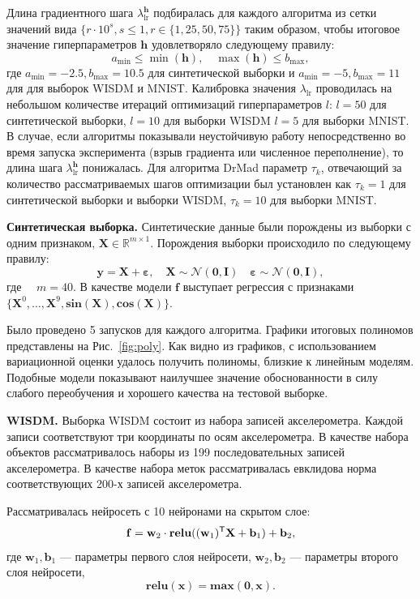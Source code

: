 Длина градиентного шага $ \lambda_{\text{lr}}^{\mathbf{h}}$ подбиралась для каждого алгоритма из сетки значений вида $\{r \cdot 10^{s}, s \leq 1, r \in \{1,25,50,75\}\}$  таким образом, чтобы итоговое значение гиперпараметров  $\mathbf{h}$  удовлетворяло следующему правилу:
\[
    a_\text{min} \leq  \min(\mathbf{h}), \quad \max(\mathbf{h}) \leq b_\text{max},
\] 
где  $a_\text{min} = -2.5, b_\text{max}=10.5$ для синтетической выборки и $a_\text{min} = -5, b_\text{max}=11$ для для выборок WISDM и MNIST.
Калибровка значения $ \lambda_{\text{lr}}$ проводилась на небольшом количестве итераций оптимизаций гиперпараметров $l$:
$l = 50$ для синтетической выборки,  $l=10$ для выборки WISDM $l=5$ для выборки MNIST. В случае, если алгоритмы показывали неустойчивую работу непосредственно во время запуска эксперимента (взрыв градиента или численное переполнение), то длина шага $ \lambda_{\text{lr}}^\mathbf{h}$ понижалась. Для алгоритма DrMad параметр $\tau_k$, отвечающий за количество рассматриваемых шагов оптимизации был установлен как $\tau_k=1$ для синтетической выборки и выборки WISDM, $\tau_k=10$ для выборки MNIST.



\textbf{Синтетическая выборка. }
Синтетические данные были порождены из выборки с одним признаком, $\mathbf{X} \in \mathbb{R}^{m \times 1}$.
Порождения выборки происходило по следующему правилу:
\[
	\mathbf{y} = \mathbf{X} + \boldsymbol{\varepsilon},\quad \mathbf{X}  \sim \mathcal{N}(\mathbf{0}, \mathbf{I}) \quad \boldsymbol{\varepsilon} \sim \mathcal{N}(\mathbf{0}, \mathbf{I}),
\]
где $\quad m = 40.$
В качестве модели $\mathbf{f}$ выступает регрессия с признаками $\{\mathbf{X}^0, \dots, \mathbf{X}^9, \textbf{sin}(\mathbf{X}), \textbf{cos}(\mathbf{X})\}$.

Было проведено 5 запусков для каждого алгоритма.
Графики итоговых полиномов представлены на Рис.~\ref{fig:poly}. Как видно из графиков, с использованием вариационной оценки удалось получить полиномы, близкие к линейным моделям. Подобные модели показывают наилучшее значение обоснованности в силу слабого переобучения и хорошего качества на тестовой выборке. 


\textbf{WISDM. }
Выборка WISDM состоит из набора записей акселерометра. Каждой записи соответствуют три координаты по осям акселерометра. В качестве набора объектов рассматривалось наборы из 199 последовательных записей акселерометра. В качестве набора меток рассматривалась евклидова норма соответствующих 200-х записей акселерометра.

Рассматривалась нейросеть с 10 нейронами на скрытом слое:
\[
    \mathbf{f} = \mathbf{w}_2 \cdot \textbf{relu}((\mathbf{w}_1)^{\mathsf{T}}\mathbf{X} + \mathbf{b}_1) +\mathbf{b}_2,
\]
где $\mathbf{w}_1, \mathbf{b}_1$ --- параметры первого слоя нейросети,
$\mathbf{w}_2, \mathbf{b}_2$ --- параметры второго слоя нейросети,
\[
    \textbf{relu}(\mathbf{x}) = \textbf{max}(\mathbf{0}, \mathbf{x}).
\]

